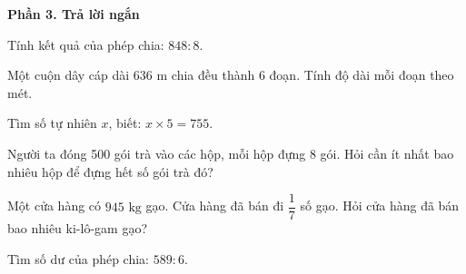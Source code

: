 \textbf{Phần 3. Trả lời ngắn}

\begin{ex} %
Tính kết quả của phép chia: $848 : 8$.
\end{ex}

\begin{ex} %
Một cuộn dây cáp dài $636\text{ m}$ chia đều thành 6 đoạn. Tính độ dài mỗi đoạn theo mét.
\end{ex}

\begin{ex} %
Tìm số tự nhiên $x$, biết: $x \times 5 = 755$.
\end{ex}

\begin{ex} %
Người ta đóng 500 gói trà vào các hộp, mỗi hộp đựng 8 gói. Hỏi cần ít nhất bao nhiêu hộp để đựng hết số gói trà đó?
\end{ex}

\begin{ex} %
Một cửa hàng có $945\text{ kg}$ gạo. Cửa hàng đã bán đi $\dfrac{1}{7}$ số gạo. Hỏi cửa hàng đã bán bao nhiêu ki-lô-gam gạo?
\end{ex}

\begin{ex} %
Tìm số dư của phép chia: $589 : 6$.
\end{ex}
